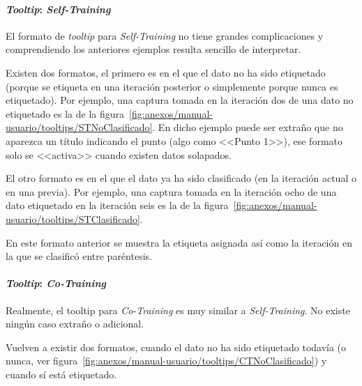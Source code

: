 
\paragraph{\textit{Tooltip}: \textit{Self-Training}}

El formato de \textit{tooltip} para \textit{Self-Training} no tiene grandes
complicaciones y comprendiendo los anteriores ejemplos resulta sencillo de
interpretar.

Existen dos formatos, el primero es en el que el dato no ha sido etiquetado
(porque se etiqueta en una iteración posterior o simplemente porque nunca es
etiquetado). Por ejemplo, una captura tomada en la iteración dos de una dato no
etiquetado es la de la
figura~\ref{fig:anexos/manual-usuario/tooltips/STNoClasificado}. En dicho
ejemplo puede ser extraño que no aparezca un título indicando el punto (algo
como <<Punto 1>>), ese formato solo se <<activa>> cuando existen datos
solapados.


El otro formato es en el que el dato ya ha sido clasificado (en la iteración
actual o en una previa). Por ejemplo, una captura tomada en la iteración ocho de
una dato etiquetado en la iteración seis es la de la
figura~\ref{fig:anexos/manual-usuario/tooltips/STClasificado}.


En este formato anterior se muestra la etiqueta asignada así como la iteración
en la que se clasificó entre paréntesis.

\paragraph{\textit{Tooltip}: \textit{Co-Training}}

Realmente, el tooltip para \textit{Co-Training} es muy similar a
\textit{Self-Training}. No existe ningún caso extraño o adicional.

Vuelven a existir dos formatos, cuando el dato no ha sido etiquetado todavía (o
nunca, ver figura~\ref{fig:anexos/manual-usuario/tooltips/CTNoClasificado}) y
cuando sí está etiquetado. 



